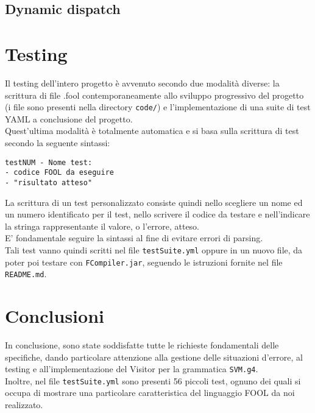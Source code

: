 \documentclass[a4paper]{article}   %
\begin{document}
\subsection{Dynamic dispatch}

\section{Testing}
Il testing dell'intero progetto è avvenuto secondo due modalità diverse: la scrittura di file .fool contemporaneamente allo sviluppo progressivo del progetto (i file sono presenti nella directory \lstinline|code/|) e l'implementazione di una suite di test YAML a conclusione del progetto.\\
Quest'ultima modalità è totalmente automatica e si basa sulla scrittura di test secondo la seguente sintassi:
\begin{lstlisting}[basicstyle=\footnotesize\ttfamily]
testNUM - Nome test:
- codice FOOL da eseguire
- "risultato atteso"
\end{lstlisting}
La scrittura di un test personalizzato consiste quindi nello scegliere un nome ed un numero identificato per il test, nello scrivere il codice da testare e nell'indicare la stringa rappresentante il valore, o l'errore, atteso.\\
E' fondamentale seguire la sintassi al fine di evitare errori di parsing.\\
Tali test vanno quindi scritti nel file \lstinline|testSuite.yml| oppure in un nuovo file, da poter poi testare con \lstinline|FCompiler.jar|, seguendo le istruzioni fornite nel file \lstinline|README.md|.
\section{Conclusioni}
In conclusione, sono state soddisfatte tutte le richieste fondamentali delle specifiche, dando particolare attenzione alla gestione delle situazioni d'errore, al testing e all'implementazione del Visitor per la grammatica \lstinline|SVM.g4|.\\
Inoltre, nel file \lstinline|testSuite.yml| sono presenti 56 piccoli test, ognuno dei quali si occupa di mostrare una particolare caratteristica del linguaggio FOOL da noi realizzato.

\end{document}
